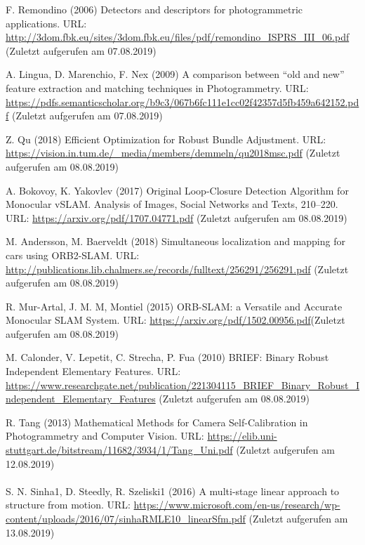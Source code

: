 \documentclass[12pt,oneside]{scrreprt}
\begin{document}
\begin{thebibliography}{10}
 F. Remondino (2006) Detectors and descriptors for photogrammetric applications. URL: \url{http://3dom.fbk.eu/sites/3dom.fbk.eu/files/pdf/remondino_ISPRS_III_06.pdf} (Zuletzt aufgerufen am 07.08.2019)

 A. Lingua, D. Marenchio, F. Nex (2009) A comparison between “old and new” feature extraction and matching techniques in Photogrammetry. URL: \url{https://pdfs.semanticscholar.org/b9c3/067b6fc111e1cc02f42357d5fb459a642152.pdf} (Zuletzt aufgerufen am 07.08.2019)

 Z. Qu (2018) Efficient Optimization for
Robust Bundle Adjustment. URL: \url{https://vision.in.tum.de/_media/members/demmeln/qu2018msc.pdf}  (Zuletzt aufgerufen am 08.08.2019)

 A. Bokovoy, K. Yakovlev (2017) Original Loop-Closure Detection Algorithm for Monocular vSLAM. Analysis of Images, Social Networks and Texts, 210–220. URL: \url{https://arxiv.org/pdf/1707.04771.pdf} (Zuletzt aufgerufen am 08.08.2019)

 M. Andersson, M. Baerveldt (2018) Simultaneous localization and mapping
for cars using ORB2-SLAM. URL: \url{http://publications.lib.chalmers.se/records/fulltext/256291/256291.pdf} (Zuletzt aufgerufen am 08.08.2019)

  R. Mur-Artal, J. M. M, Montiel (2015) ORB-SLAM: a Versatile and Accurate Monocular SLAM System. URL: \url{https://arxiv.org/pdf/1502.00956.pdf}(Zuletzt aufgerufen am 08.08.2019)

 M. Calonder, V. Lepetit, C. Strecha, P. Fua (2010) BRIEF: Binary Robust Independent Elementary Features. URL: \url{https://www.researchgate.net/publication/221304115_BRIEF_Binary_Robust_Independent_Elementary_Features} (Zuletzt aufgerufen am 08.08.2019)

 R. Tang (2013) Mathematical Methods for Camera Self-Calibration
in Photogrammetry and Computer Vision. URL: \url{https://elib.uni-stuttgart.de/bitstream/11682/3934/1/Tang_Uni.pdf} (Zuletzt aufgerufen am 12.08.2019) \\ \\

 S. N. Sinha1, D. Steedly, R. Szeliski1 (2016) A multi-stage linear approach to structure from motion. URL: \url{https://www.microsoft.com/en-us/research/wp-content/uploads/2016/07/sinhaRMLE10_linearSfm.pdf} (Zuletzt aufgerufen am 13.08.2019)


\end{thebibliography}
\end{document}

